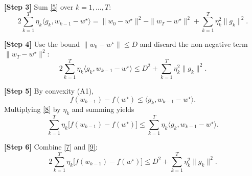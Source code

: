 \documentclass{article}
\begin{document}
\noindent\textbf{[Step 3]} Sum \eqref{5} over $k=1,\dots,T$:
\[
2\sum_{k=1}^{T}\eta_k\langle g_k,w_{k-1}-w^\star\rangle
   =\|w_{0}-w^\star\|^{2}
    -\|w_T-w^\star\|^{2}
    +\sum_{k=1}^{T}\eta_k^{2}\|g_k\|^{2}.
\tag{6}
\]

\noindent\textbf{[Step 4]} Use the bound $\|w_0-w^\star\|\le D$ and discard the non‑negative term $\|w_T-w^\star\|^{2}$:
\[
2\sum_{k=1}^{T}\eta_k\langle g_k,w_{k-1}-w^\star\rangle
   \le D^{2}
    +\sum_{k=1}^{T}\eta_k^{2}\|g_k\|^{2}.
\tag{7}
\]

\noindent\textbf{[Step 5]} By convexity (A1),
\[
f(w_{k-1})-f(w^\star)
   \le \langle g_k, w_{k-1}-w^\star\rangle .
\tag{8}
\]
Multiplying \eqref{8} by $\eta_k$ and summing yields
\[
\sum_{k=1}^{T}\eta_k\bigl[f(w_{k-1})-f(w^\star)\bigr]
   \le \sum_{k=1}^{T}\eta_k\langle g_k,w_{k-1}-w^\star\rangle .
\tag{9}
\]

\noindent\textbf{[Step 6]} Combine \eqref{7} and \eqref{9}:
\[
2\sum_{k=1}^{T}\eta_k\bigl[f(w_{k-1})-f(w^\star)\bigr]
   \le D^{2}
    +\sum_{k=1}^{T}\eta_k^{2}\|g_k\|^{2}.
\tag{10}
\]
\end{document}
